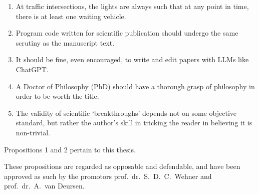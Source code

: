 \begin{enumerate}[widest=10]
  \item At traffic intersections, the lights are always such that at any point in time, there is at least one waiting vehicle.
  \item Program code written for scientific publication should undergo the same scrutiny as the manuscript text.
  \item It should be fine, even encouraged, to write and edit papers with LLMs like ChatGPT.
  \item A Doctor of Philosophy (PhD) should have a thorough grasp of philosophy in order to be worth the title.
  \item The validity of scientific `breakthroughs' depends not on some objective standard, but rather the author's skill in tricking the reader in believing it is non-trivial.

\end{enumerate}

\bigskip \noindent
Propositions 1 and 2 pertain to this thesis.

\bigskip \noindent
These propositions are regarded as opposable and defendable, and have been approved as such by the
promotors prof.\ dr.\ S.\ D.\ C.\ Wehner and prof.\ dr.\ A.\ van Deursen.
